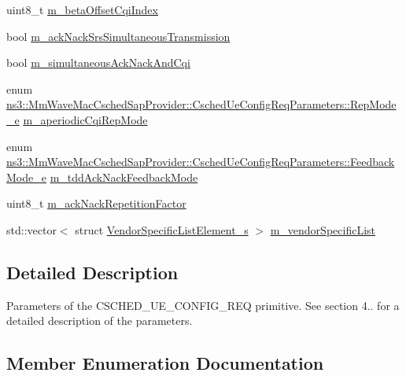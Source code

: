 \begin{DoxyCompactItemize}
\item 
uint8\+\_\+t \hyperlink{structns3_1_1MmWaveMacCschedSapProvider_1_1CschedUeConfigReqParameters_a919e879e2a160f53b34072f1b4df374a}{m\+\_\+beta\+Offset\+Cqi\+Index}
\item 
bool \hyperlink{structns3_1_1MmWaveMacCschedSapProvider_1_1CschedUeConfigReqParameters_a15b8c40cedb3721058db9f96c296e33f}{m\+\_\+ack\+Nack\+Srs\+Simultaneous\+Transmission}
\item 
bool \hyperlink{structns3_1_1MmWaveMacCschedSapProvider_1_1CschedUeConfigReqParameters_ae0c8734a0ad7eb16833fa5dc139eb4d6}{m\+\_\+simultaneous\+Ack\+Nack\+And\+Cqi}
\item 
enum \hyperlink{structns3_1_1MmWaveMacCschedSapProvider_1_1CschedUeConfigReqParameters_a177b0da48bc6f17c89a5571a76cacf34}{ns3\+::\+Mm\+Wave\+Mac\+Csched\+Sap\+Provider\+::\+Csched\+Ue\+Config\+Req\+Parameters\+::\+Rep\+Mode\+\_\+e} \hyperlink{structns3_1_1MmWaveMacCschedSapProvider_1_1CschedUeConfigReqParameters_a8f53c8b357036c10e41a7664e597caf5}{m\+\_\+aperiodic\+Cqi\+Rep\+Mode}
\item 
enum \hyperlink{structns3_1_1MmWaveMacCschedSapProvider_1_1CschedUeConfigReqParameters_a195713a0b06d88abc7f2d9a27387ba79}{ns3\+::\+Mm\+Wave\+Mac\+Csched\+Sap\+Provider\+::\+Csched\+Ue\+Config\+Req\+Parameters\+::\+Feedback\+Mode\+\_\+e} \hyperlink{structns3_1_1MmWaveMacCschedSapProvider_1_1CschedUeConfigReqParameters_a24d13e8e28931c61be605fc82bf14c2e}{m\+\_\+tdd\+Ack\+Nack\+Feedback\+Mode}
\item 
uint8\+\_\+t \hyperlink{structns3_1_1MmWaveMacCschedSapProvider_1_1CschedUeConfigReqParameters_ad5a0e01be0e474b8d4dfa5503b71bfee}{m\+\_\+ack\+Nack\+Repetition\+Factor}
\item 
std\+::vector$<$ struct \hyperlink{structns3_1_1VendorSpecificListElement__s}{Vendor\+Specific\+List\+Element\+\_\+s} $>$ \hyperlink{structns3_1_1MmWaveMacCschedSapProvider_1_1CschedUeConfigReqParameters_af06512cd506b24b0c0092ff8cb451820}{m\+\_\+vendor\+Specific\+List}
\end{DoxyCompactItemize}


\subsection{Detailed Description}
Parameters of the C\+S\+C\+H\+E\+D\+\_\+\+U\+E\+\_\+\+C\+O\+N\+F\+I\+G\+\_\+\+R\+EQ primitive. See section 4.. for a detailed description of the parameters. 

\subsection{Member Enumeration Documentation}
